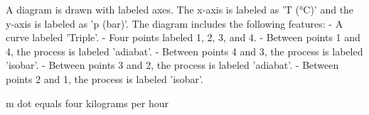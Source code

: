 A diagram is drawn with labeled axes. The x-axis is labeled as 'T (°C)' and the y-axis is labeled as 'p (bar)'. The diagram includes the following features:  
- A curve labeled 'Triple'.  
- Four points labeled 1, 2, 3, and 4.  
- Between points 1 and 4, the process is labeled 'adiabat'.  
- Between points 4 and 3, the process is labeled 'isobar'.  
- Between points 3 and 2, the process is labeled 'adiabat'.  
- Between points 2 and 1, the process is labeled 'isobar'.

m dot equals four kilograms per hour